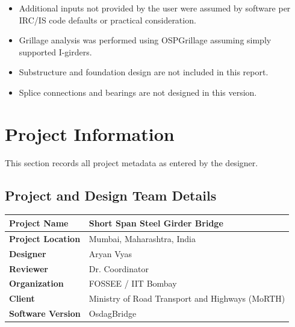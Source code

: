 \documentclass[12pt,a4paper]{report}
\numberwithin{table}{chapter}
\numberwithin{figure}{chapter}
\begin{document}
\begin{itemize}
\item Additional inputs not provided by the user were assumed by software per IRC/IS code defaults or practical consideration.
\item Grillage analysis was performed using OSPGrillage assuming simply supported I-girders.
\item Substructure and foundation design are not included in this report.
\item Splice connections and bearings are not designed in this version.
\end{itemize}

\titleformat{\chapter}[block]{\normalfont\Large\bfseries\centering}{\thechapter}{1em}{}
\titlespacing*{\chapter}{0pt}{-30pt}{10pt}


\chapter{Project Information}

This section records all project metadata as entered by the designer.

\section{Project and Design Team Details}
\label{sec:project-details}

\begin{tabular}{|L{5.5cm}|L{8.5cm}|}
\hline
\textbf{Project Name} & Short Span Steel Girder Bridge \\
\hline
\textbf{Project Location} & Mumbai, Maharashtra, India \\
\hline
\textbf{Designer} & Aryan Vyas \\
\hline
\textbf{Reviewer} & Dr. Coordinator \\
\hline
\textbf{Organization} & FOSSEE / IIT Bombay \\
\hline
\textbf{Client} & Ministry of Road Transport and Highways (MoRTH) \\
\hline
\textbf{Software Version} & OsdagBridge \\
\hline
\end{tabular}
\end{document}
